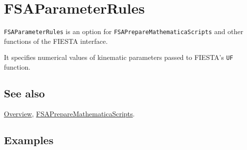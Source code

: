 \documentclass[../FeynHelpersManual.tex]{subfiles}
\begin{document}
\begin{Shaded}
\begin{Highlighting}[]
 
\end{Highlighting}
\end{Shaded}

\hypertarget{fsaparameterrules}{
\section{FSAParameterRules}\label{fsaparameterrules}}

\texttt{FSAParameterRules} is an option for
\texttt{FSAPrepareMathematicaScripts} and other functions of the FIESTA
interface.

It specifies numerical values of kinematic parameters passed to FIESTA's
\texttt{UF} function.

\subsection{See also}

\hyperlink{toc}{Overview},
\hyperlink{fsapreparemathematicascripts}{FSAPrepareMathematicaScripts}.

\subsection{Examples}
\end{document}
